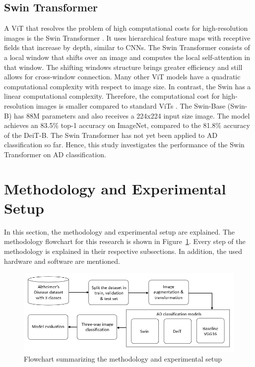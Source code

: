 \documentclass[11pt, a4paper]{article}
\begin{document}
\subsection{Swin Transformer} \label{subs:swin} 
A ViT that resolves the problem of high computational costs for high-resolution images is the Swin Transformer \cite{Liu2021SwinWindows}. It uses hierarchical feature maps with receptive fields that increase by depth, similar to CNNs. The Swin Transformer consists of a local window that shifts over an image and computes the local self-attention in that window. The shifting windows structure brings greater efficiency and still allows for cross-window connection. Many other ViT models have a quadratic computational complexity with respect to image size. In contrast, the Swin has a linear computational complexity. Therefore, the computational cost for high-resolution images is smaller compared to standard ViTs \citep{Liu2021SwinWindows}. The Swin-Base (Swin-B) has 88M parameters and also receives a 224x224 input size image. The model achieves an 83.5\% top-1 accuracy on ImageNet, compared to the 81.8\% accuracy of the DeiT-B. The Swin Transformer has not yet been applied to AD classification so far. Hence, this study investigates the performance of the Swin Transformer on AD classification.


\newpage

\section{Methodology and Experimental Setup}
In this section, the methodology and experimental setup are explained. The methodology flowchart for this research is shown in Figure~\ref{fig:flowchart}. Every step of the methodology is explained in their respective subsections. In addition, the used hardware and software are mentioned.

\begin{figure}[b]
    \centering
    \includegraphics[width=\textwidth]{Methodology flowchart.png}
    \caption{Flowchart summarizing the methodology and experimental setup}
    \label{fig:flowchart}
\end{figure}
\end{document}
